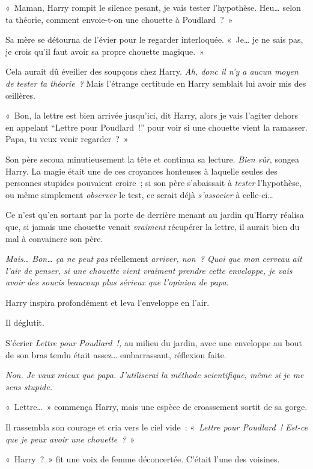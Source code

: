 «~Maman, Harry rompit le silence pesant, je vais tester l'hypothèse. Heu… selon ta théorie, comment envoie-t-on une chouette à Poudlard~?~»

Sa mère se détourna de l'évier pour le regarder interloquée. «~Je… je ne sais pas, je crois qu'il faut avoir sa propre chouette magique.~»

Cela aurait dû éveiller des soupçons chez Harry. \emph{Ah, donc il n'y a aucun moyen de tester ta théorie~?} Mais l'étrange certitude en Harry semblait lui avoir mis des œillères.

«~Bon, la lettre est bien arrivée jusqu'ici, dit Harry, alors je vais l'agiter dehors en appelant ``Lettre pour Poudlard~!'' pour voir si une chouette vient la ramasser. Papa, tu veux venir regarder~?~»

Son père secoua minutieusement la tête et continua sa lecture.  \emph{Bien sûr}, songea Harry. La magie était une de ces croyances honteuses à laquelle seules des personnes stupides pouvaient croire~; si son père s'abaissait à \emph{tester} l'hypothèse, ou même simplement \emph{observer} le test, ce serait déjà \emph{s'associer} à celle-ci…

Ce n'est qu'en sortant par la porte de derrière menant au jardin qu'Harry réalisa que, si jamais une chouette venait \emph{vraiment} récupérer la lettre, il aurait bien du mal à convaincre son père.

\emph{Mais… Bon… ça ne peut pas} réellement \emph{arriver, non~? Quoi que mon cerveau ait l'air de penser, si une chouette vient vraiment prendre cette enveloppe, je vais avoir des soucis beaucoup plus sérieux que l'opinion de papa.}

Harry inspira profondément et leva l'enveloppe en l'air.

Il déglutit.

S'écrier \emph{Lettre pour Poudlard~!,} au milieu du jardin, avec une enveloppe au bout de son bras tendu était assez… embarrassant, réflexion faite.

\emph{Non. Je vaux mieux que papa. J'utiliserai la méthode scientifique, même si je me sens stupide.}

«~Lettre…~» commença Harry, mais une espèce de croassement sortit de sa gorge.

Il rassembla son courage et cria vers le ciel vide~: «~\emph{Lettre pour Poudlard~! Est-ce que je peux avoir une chouette~?}~»

«~Harry~?~» fit une voix de femme déconcertée. C'était l'une des voisines.

